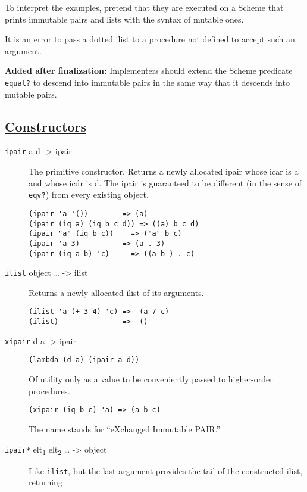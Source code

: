 To interpret the examples, pretend that they are executed on a Scheme
that prints immutable pairs and lists with the syntax of mutable ones.

It is an error to pass a dotted ilist to a procedure not defined to
accept such an argument.

\textbf{Added after finalization:} Implementers should extend the Scheme
predicate \texttt{equal?} to descend into immutable pairs in the same
way that it descends into mutable pairs.

\subsection{\texorpdfstring{\href{}{Constructors}}{Constructors}}\label{constructors}

\begin{description}
\item[ \href{}{} \texttt{ipair} a d -\textgreater{} ipair ]
The primitive constructor. Returns a newly allocated ipair whose icar is
a and whose icdr is d. The ipair is guaranteed to be different (in the
sense of \texttt{eqv?}) from every existing object.

\begin{verbatim}
(ipair 'a '())        => (a)
(ipair (iq a) (iq b c d)) => ((a) b c d)
(ipair "a" (iq b c))    => ("a" b c)
(ipair 'a 3)          => (a . 3)
(ipair (iq a b) 'c)     => ((a b ) . c)
\end{verbatim}
\item[ \href{}{} \texttt{ilist} object \ldots{} -\textgreater{} ilist ]
Returns a newly allocated ilist of its arguments.

\begin{verbatim}
(ilist 'a (+ 3 4) 'c) =>  (a 7 c)
(ilist)               =>  ()
\end{verbatim}
\item[ \href{}{} \texttt{xipair} d a -\textgreater{} ipair ]
\begin{verbatim}
(lambda (d a) (ipair a d))
\end{verbatim}

Of utility only as a value to be conveniently passed to higher-order
procedures.

\begin{verbatim}
(xipair (iq b c) 'a) => (a b c)
\end{verbatim}

The name stands for ``eXchanged Immutable PAIR.'' \href{}{}
\item[\texttt{ipair*} elt\textsubscript{1} elt\textsubscript{2} \ldots{}
-\textgreater{} object ]
Like \texttt{ilist}, but the last argument provides the tail of the
constructed ilist, returning


\end{description}

